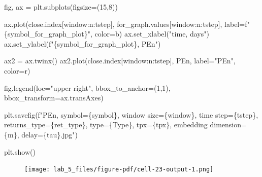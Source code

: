 \documentclass[
  letterpaper,
]{report}
\newenvironment{Shaded}{\begin{snugshade}}{\end{snugshade}}
\newcommand{\DecValTok}[1]{\textcolor[rgb]{0.68,0.00,0.00}{#1}}
\newcommand{\NormalTok}[1]{\textcolor[rgb]{0.00,0.23,0.31}{#1}}
\newcommand{\OperatorTok}[1]{\textcolor[rgb]{0.37,0.37,0.37}{#1}}
\newcommand{\SpecialCharTok}[1]{\textcolor[rgb]{0.37,0.37,0.37}{#1}}
\newcommand{\SpecialStringTok}[1]{\textcolor[rgb]{0.13,0.47,0.30}{#1}}
\newcommand{\StringTok}[1]{\textcolor[rgb]{0.13,0.47,0.30}{#1}}
\begin{document}
\begin{Shaded}
\begin{Highlighting}[]
\NormalTok{fig, ax }\OperatorTok{=}\NormalTok{ plt.subplots(figsize}\OperatorTok{=}\NormalTok{(}\DecValTok{15}\NormalTok{,}\DecValTok{8}\NormalTok{))}

\NormalTok{ax.plot(close.index[window:n:tstep], for\_graph.values[window:n:tstep], label}\OperatorTok{=}\SpecialStringTok{f"}\SpecialCharTok{\{}\NormalTok{symbol\_for\_graph\_plot}\SpecialCharTok{\}}\SpecialStringTok{"}\NormalTok{, color}\OperatorTok{=}\StringTok{\textquotesingle{}b\textquotesingle{}}\NormalTok{)}
\NormalTok{ax.set\_xlabel(}\StringTok{"time, days"}\NormalTok{)}
\NormalTok{ax.set\_ylabel(}\SpecialStringTok{f"}\SpecialCharTok{\{}\NormalTok{symbol\_for\_graph\_plot}\SpecialCharTok{\}}\SpecialStringTok{, PEn"}\NormalTok{)}

\NormalTok{ax2 }\OperatorTok{=}\NormalTok{ ax.twinx()}
\NormalTok{ax2.plot(close.index[window:n:tstep], PEn, label}\OperatorTok{=}\StringTok{"PEn"}\NormalTok{, color}\OperatorTok{=}\StringTok{\textquotesingle{}r\textquotesingle{}}\NormalTok{)}

\NormalTok{fig.legend(loc}\OperatorTok{=}\StringTok{"upper right"}\NormalTok{, bbox\_to\_anchor}\OperatorTok{=}\NormalTok{(}\DecValTok{1}\NormalTok{,}\DecValTok{1}\NormalTok{), bbox\_transform}\OperatorTok{=}\NormalTok{ax.transAxes)}

\NormalTok{plt.savefig(}\SpecialStringTok{f"PEn, symbol=}\SpecialCharTok{\{}\NormalTok{symbol}\SpecialCharTok{\}}\SpecialStringTok{, window size=}\SpecialCharTok{\{}\NormalTok{window}\SpecialCharTok{\}}\SpecialStringTok{, time step=}\SpecialCharTok{\{}\NormalTok{tstep}\SpecialCharTok{\}}\SpecialStringTok{, returns\_type=}\SpecialCharTok{\{}\NormalTok{ret\_type}\SpecialCharTok{\}}\SpecialStringTok{, type=}\SpecialCharTok{\{}\NormalTok{Type}\SpecialCharTok{\}}\SpecialStringTok{, tpx=}\SpecialCharTok{\{}\NormalTok{tpx}\SpecialCharTok{\}}\SpecialStringTok{, embedding dimension=}\SpecialCharTok{\{}\NormalTok{m}\SpecialCharTok{\}}\SpecialStringTok{, delay=}\SpecialCharTok{\{}\NormalTok{tau}\SpecialCharTok{\}}\SpecialStringTok{.jpg"}\NormalTok{)}

\NormalTok{plt.show()}
\end{Highlighting}
\end{Shaded}

\begin{figure}[H]

{\centering \texttt{[image: lab\_5\_files/figure-pdf/cell-23-output-1.png]}

}

\end{figure}
\end{document}
